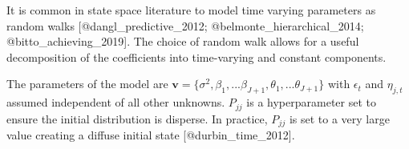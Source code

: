 \documentclass[
]{article}
\begin{document}
It is common in state space literature to model time varying parameters
as random walks {[}@dangl\_predictive\_2012;
@belmonte\_hierarchical\_2014; @bitto\_achieving\_2019{]}. The choice of
random walk allows for a useful decomposition of the coefficients into
time-varying and constant components.

The parameters of the model are
\(\mathbf{v}=\{\sigma^2, \beta_1,...\beta_{J+1},\theta_1,...\theta_{J+1}\}\)
with \(\epsilon_t\) and \(\eta_{j,t}\) assumed independent of all other
unknowns. \(P_{jj}\) is a hyperparameter set to ensure the initial
distribution is disperse. In practice, \(P_{jj}\) is set to a very large
value creating a diffuse initial state {[}@durbin\_time\_2012{]}.
\end{document}
